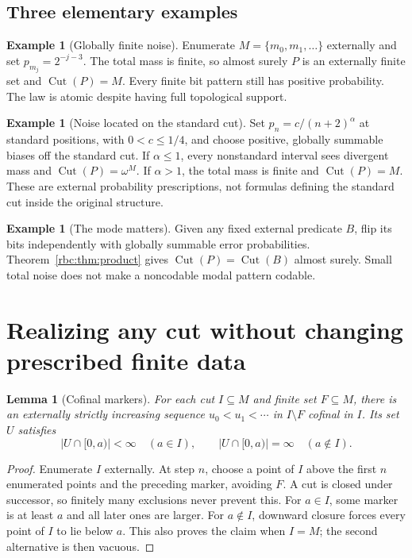 \documentclass[11pt]{article}
\numberwithin{equation}{section}
\newtheorem{lemma}[theorem]{Lemma}
\theoremstyle{definition}
\newtheorem{example}[theorem]{Example}
\theoremstyle{remark}
\newcommand{\std}{\omega^M}
\newcommand{\Cut}{\operatorname{Cut}}
\begin{document}
\subsection{Three elementary examples}

\begin{example}[Globally finite noise]
Enumerate $M=\{m_0,m_1,\ldots\}$ externally and set
$p_{m_j}=2^{-j-3}$. The total mass is finite, so almost surely $P$ is an
externally finite set and $\Cut(P)=M$. Every finite bit pattern still has
positive probability. The law is atomic despite having full topological
support.
\end{example}

\begin{example}[Noise located on the standard cut]
Set $p_n=c/(n+2)^\alpha$ at standard positions, with $0<c\le1/4$, and
choose positive, globally summable biases off the standard cut. If
$\alpha\le1$, every nonstandard interval sees divergent mass and
$\Cut(P)=\std$. If $\alpha>1$, the total mass is finite and
$\Cut(P)=M$. These are external probability prescriptions, not formulas
defining the standard cut inside the original structure.
\end{example}

\begin{example}[The mode matters]
Given any fixed external predicate $B$, flip its bits independently with
globally summable error probabilities. Theorem~\ref{rbc:thm:product} gives
$\Cut(P)=\Cut(B)$ almost surely. Small total noise does not make a
noncodable modal pattern codable.
\end{example}

\section{Realizing any cut without changing prescribed finite data}
\label{rbc:sec:realization}

\begin{lemma}[Cofinal markers]
\label{rbc:lem:markers}
For each cut $I\subseteq M$ and finite set $F\subseteq M$, there is an
externally strictly increasing sequence $u_0<u_1<\cdots$ in $I\setminus F$
cofinal in $I$. Its set $U$ satisfies
\[
 |U\cap[0,a)|<\infty\quad(a\in I),\qquad
 |U\cap[0,a)|=\infty\quad(a\notin I).
\]
\end{lemma}

\begin{proof}
Enumerate $I$ externally. At step $n$, choose a point of $I$ above the first
$n$ enumerated points and the preceding marker, avoiding $F$. A cut is
closed under successor, so finitely many exclusions never prevent this.
For $a\in I$, some marker is at least $a$ and all later ones are larger.
For $a\notin I$, downward closure forces every point of $I$ to lie below
$a$. This also proves the claim when $I=M$; the second alternative is then
vacuous.
\end{proof}
\end{document}
